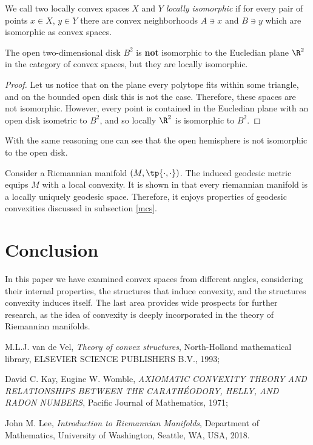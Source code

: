 \documentclass[12pt, a4paper]{article}
\begin{document}
\begin{definition}
    We call two locally convex spaces \(X\) and \(Y\) \textit{locally isomorphic} if for every pair of points \(x \in X\), \(y \in Y\) there are convex neighborhoods \(A \ni x\) and \(B \ni y\) which are isomorphic as convex spaces.
\end{definition}

\begin{statement}
The open two-dimensional disk \(B^2\) is \textbf{not} isomorphic to the Eucledian plane \(\R^2\) in the category of convex spaces, but they are locally isomorphic.
\end{statement}
\begin{proof}
    Let us notice that on the plane every polytope fits within some triangle, and on the bounded open disk this is not the case. Therefore, these spaces are not isomorphic. However, every point is contained in the Eucledian plane with an open disk isometric to \(B^2\), and so locally \(\R^2\) is isomorphic to \(B^2\).
\end{proof}

\begin{remark}
    With the same reasoning one can see that the open hemisphere is not isomorphic to the open disk.
\end{remark}

\begin{observation}
    Consider a Riemannian manifold \((M, \tp{\cdot, \cdot})\). The induced geodesic metric equips \(M\) with a local convexity. It is shown in \cite{book3} that every riemannian manifold is a locally uniquely geodesic space. Therefore, it enjoys properties of geodesic convexities discussed in subsection \ref{mcs}.
\end{observation}


\section{Conclusion}

In this paper we have examined convex spaces from different angles, considering their internal properties, the structures that induce convexity, and the structures convexity induces itself. The last area provides wide prospects for further research, as the idea of convexity is deeply incorporated in the theory of Riemannian manifolds.


\begin{thebibliography}{99}
     M.L.J. van de Vel, \textit{Theory of convex structures}, North-Holland mathematical library, ELSEVIER SCIENCE PUBLISHERS B.V., 1993;

     David C. Kay, Eugine W. Womble, \textit{AXIOMATIC CONVEXITY THEORY AND RELATIONSHIPS BETWEEN THE CARATH\'EODORY, HELLY, AND RADON NUMBERS}, Pacific Journal of Mathematics, 1971;

     John M. Lee, \textit{Introduction to Riemannian Manifolds}, Department of Mathematics, University of Washington, Seattle, WA, USA, 2018.
\end{thebibliography}
\end{document}
